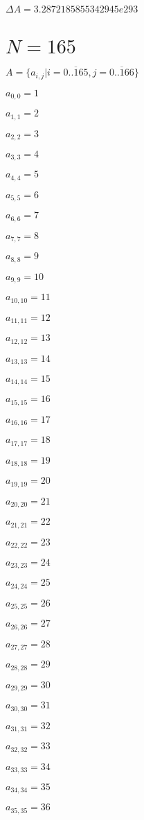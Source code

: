 \documentclass[a4paper,12pt]{article}
\begin{document}
$\Delta A = 3.2872185855342945e293$



\section{ $N = 165$ }
$A = \{ a _{ i, j } | i = \overline { 0..165 }, j = \overline { 0..166 } \}$

$a _{ 0, 0 } = 1$

$a _{ 1, 1 } = 2$

$a _{ 2, 2 } = 3$

$a _{ 3, 3 } = 4$

$a _{ 4, 4 } = 5$

$a _{ 5, 5 } = 6$

$a _{ 6, 6 } = 7$

$a _{ 7, 7 } = 8$

$a _{ 8, 8 } = 9$

$a _{ 9, 9 } = 10$

$a _{ 10, 10 } = 11$

$a _{ 11, 11 } = 12$

$a _{ 12, 12 } = 13$

$a _{ 13, 13 } = 14$

$a _{ 14, 14 } = 15$

$a _{ 15, 15 } = 16$

$a _{ 16, 16 } = 17$

$a _{ 17, 17 } = 18$

$a _{ 18, 18 } = 19$

$a _{ 19, 19 } = 20$

$a _{ 20, 20 } = 21$

$a _{ 21, 21 } = 22$

$a _{ 22, 22 } = 23$

$a _{ 23, 23 } = 24$

$a _{ 24, 24 } = 25$

$a _{ 25, 25 } = 26$

$a _{ 26, 26 } = 27$

$a _{ 27, 27 } = 28$

$a _{ 28, 28 } = 29$

$a _{ 29, 29 } = 30$

$a _{ 30, 30 } = 31$

$a _{ 31, 31 } = 32$

$a _{ 32, 32 } = 33$

$a _{ 33, 33 } = 34$

$a _{ 34, 34 } = 35$

$a _{ 35, 35 } = 36$
\end{document}
